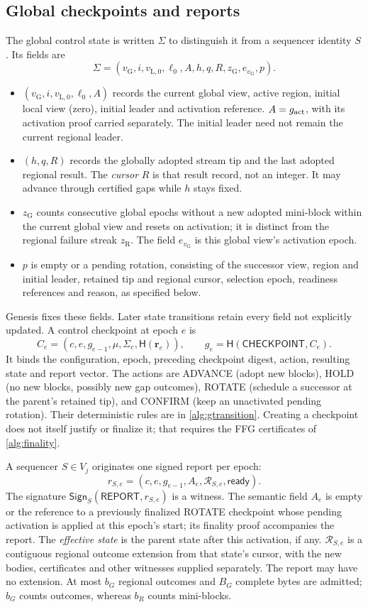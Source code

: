 \documentclass[11pt,a4paper,onecolumn]{article}
\newcommand{\Hash}{\mathsf H}
\newcommand{\Sig}{\mathsf{Sign}}
\newcommand{\gv}{v_{\mathrm G}}
\newcommand{\Tag}[1]{\mathsf{#1}}
\theoremstyle{remark}\newtheorem{example}[definition]{Example}
\begin{document}
\subsection{Global checkpoints and reports}\label{sec:gobjects}
The global control state is written $\Sigma$ to distinguish it from a
sequencer identity $S$. Its fields are
\[
 \Sigma=(\gv,i,v_{\mathrm L,0},\ell_0,A,h,q,R,z_{\mathrm G},e_{\gv},p).
\]
\begin{itemize}
\item $(\gv,i,v_{\mathrm L,0},\ell_0,A)$ records the current global view,
active region, initial local view (zero), initial leader and activation
reference. $A=g_{\rm act}$, with its activation proof carried separately.
The initial leader need not remain the current regional leader.
\item $(h,q,R)$ records the globally adopted stream tip and the last adopted
regional result. The \emph{cursor} $R$ is that result record, not an integer.
It may advance through certified gaps while $h$ stays fixed.
\item $z_{\mathrm G}$ counts consecutive global epochs without a new adopted
mini-block within the current global view and resets on activation; it is
distinct from the regional failure streak $z_{\mathrm R}$.
The field $e_{\gv}$ is this global view's activation epoch.
\item $p$ is empty or a pending rotation, consisting of the successor view,
region and initial leader, retained tip and regional cursor, selection epoch,
readiness references and reason, as specified below.
\end{itemize}
Genesis fixes these fields. Later state transitions retain every field not
explicitly updated. A control checkpoint at epoch $e$ is
\begin{equation}\label{eq:global}
 C_e=(c,e,g_{e-1},\mu,\Sigma_e,\Hash(\mathbf r_e)),\qquad
 g_e=\Hash(\Tag{CHECKPOINT},C_e).
\end{equation}
It binds the configuration, epoch, preceding checkpoint digest, action,
resulting state and report vector. The actions are ADVANCE (adopt new blocks),
HOLD (no new blocks, possibly new gap outcomes), ROTATE (schedule a successor
at the parent's retained tip), and CONFIRM (keep an unactivated pending
rotation). Their deterministic rules are in \cref{alg:gtransition}.
Creating a checkpoint does not itself justify or finalize it; that requires
the FFG certificates of \cref{alg:finality}.

A sequencer $S\in V_j$ originates one signed report per epoch:
\[
 r_{S,e}=(c,e,g_{e-1},A_e,\mathcal R_{S,e},\mathsf{ready}).
\]
The signature $\Sig_S(\Tag{REPORT},r_{S,e})$ is a witness. The semantic field $A_e$ is empty or the
reference to a previously finalized ROTATE checkpoint whose pending activation
is applied at this epoch's start; its finality proof accompanies the report.
The \emph{effective state} is the parent state after this activation, if any.
$\mathcal R_{S,e}$ is a contiguous regional outcome extension from that state's
cursor, with the new bodies, certificates and other witnesses supplied
separately. The report may have no extension. At most $b_G$ regional outcomes
and $B_G$ complete bytes are admitted; $b_G$ counts outcomes, whereas $b_R$
counts mini-blocks.
\end{document}
